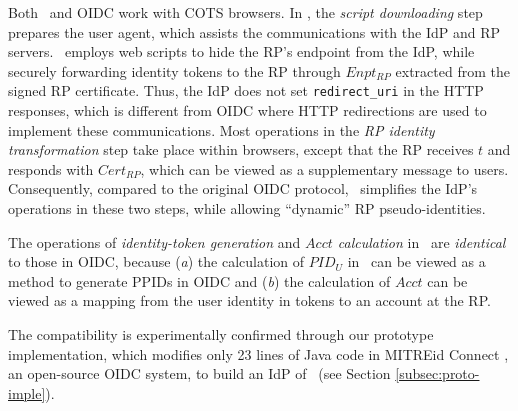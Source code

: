 Both \usso\ and OIDC work with COTS browsers. %
In \usso, the \emph{script downloading} step prepares the user agent, which assists the communications with the IdP and RP servers. \usso\ employs web scripts to hide the RP's endpoint from the IdP, while securely forwarding identity tokens to the RP through $Enpt_{RP}$ extracted from the signed RP certificate.
Thus, the IdP does not set \verb+redirect_uri+ in the HTTP responses, which is different from OIDC where HTTP redirections are used to implement these communications. Most operations in the \emph{RP identity transformation} step take place within browsers,
except that the RP receives $t$ and responds with $Cert_{RP}$,
which can be viewed as a supplementary message to users.
Consequently, compared to the original OIDC protocol, \usso\ simplifies the IdP's operations in these two steps, while allowing ``dynamic'' RP pseudo-identities.

The operations of \emph{identity-token generation} and \emph{$Acct$ calculation} in \usso\ are \emph{identical} to those in OIDC,
 because (\emph{a}) the calculation of $PID_U$ in \usso\ can be viewed as a method to generate PPIDs in OIDC and (\emph{b}) the calculation of $Acct$ can be viewed as a mapping from the user identity in tokens to an account at the RP.

The compatibility is experimentally confirmed through our prototype implementation, which modifies only 23 lines of Java code in MITREid Connect \cite{MITREid}, an open-source OIDC system, to build an IdP of \usso\ (see Section \ref{subsec:proto-imple}).

